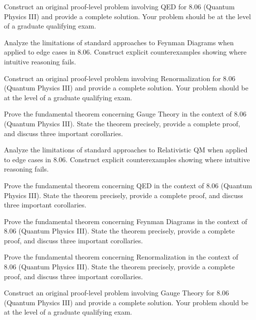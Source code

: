 \documentclass[12pt,a4paper]{exam}
\begin{document}
\begin{questions}
\vspace{0.3cm}

\question[2]
Construct an original proof-level problem involving QED for 8.06 (Quantum Physics III) and provide a complete solution. Your problem should be at the level of a graduate qualifying exam.

\vspace{0.3cm}

\question[4]
Analyze the limitations of standard approaches to Feynman Diagrams when applied to edge cases in 8.06. Construct explicit counterexamples showing where intuitive reasoning fails.

\vspace{0.3cm}

\question[6]
Construct an original proof-level problem involving Renormalization for 8.06 (Quantum Physics III) and provide a complete solution. Your problem should be at the level of a graduate qualifying exam.

\vspace{0.3cm}

\question[5]
Prove the fundamental theorem concerning Gauge Theory in the context of 8.06 (Quantum Physics III). State the theorem precisely, provide a complete proof, and discuss three important corollaries.

\vspace{0.3cm}

\question[3]
Analyze the limitations of standard approaches to Relativistic QM when applied to edge cases in 8.06. Construct explicit counterexamples showing where intuitive reasoning fails.

\vspace{0.3cm}

\question[5]
Prove the fundamental theorem concerning QED in the context of 8.06 (Quantum Physics III). State the theorem precisely, provide a complete proof, and discuss three important corollaries.

\vspace{0.3cm}

\question[2]
Prove the fundamental theorem concerning Feynman Diagrams in the context of 8.06 (Quantum Physics III). State the theorem precisely, provide a complete proof, and discuss three important corollaries.

\vspace{0.3cm}

\question[4]
Prove the fundamental theorem concerning Renormalization in the context of 8.06 (Quantum Physics III). State the theorem precisely, provide a complete proof, and discuss three important corollaries.

\vspace{0.3cm}

\question[6]
Construct an original proof-level problem involving Gauge Theory for 8.06 (Quantum Physics III) and provide a complete solution. Your problem should be at the level of a graduate qualifying exam.

\vspace{0.3cm}

\end{questions}
\end{document}
